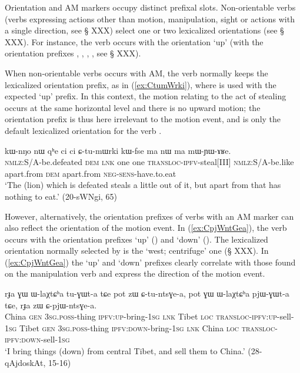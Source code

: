 Orientation and AM markers occupy distinct prefixal slots. Non-orientable verbs (verbs expressing actions other than motion, manipulation, sight or actions with a single direction, see § XXX) select one or two lexicalized orientations (see § XXX). For instance, the verb  occurs with the orientation `up' (with the orientation prefixes , , , , see § XXX). 

When non-orientable verbs occurs with AM, the verb normally keeps the lexicalized orientation prefix, as in (\ref{ex:CtumWrki}), where  is used with the expected  `up' prefix. In this context, the motion relating to the act of stealing occurs at the same horizontal level and there is no upward motion; the orientation prefix is thus here irrelevant to the motion event, and is only the default lexicalized orientation for the verb .

\begin{exe}
\ex \label{ex:CtumWrki}
 \gll kɯ-nŋo nɯ qʰe ci ci ɕ-tu-mɯrki kɯ-fse ma nɯ ma mɯ-ɲɯ-ɤʁe. \\
\textsc{nmlz}:S/A-be.defeated \textsc{dem} \textsc{lnk} one one \textsc{transloc}-\textsc{ipfv}-steal[III] \textsc{nmlz}:S/A-be.like apart.from \textsc{dem} apart.from \textsc{neg}-\textsc{sens}-have.to.eat \\
\glt `The (lion) which is defeated steals a little out of it, but apart from that has nothing to eat.' (20-sWNgi, 65)
\end{exe}

However, alternatively, the orientation prefixes of verbs with an AM marker can also reflect the orientation of the motion event. In (\ref{ex:CpjWntGea}), the verb  occurs with the orientation prefixes `up' () and `down'  (). The lexicalized orientation normally selected by   is the `west; centrifuge' one (§ XXX). In (\ref{ex:CpjWntGea}) the `up' and `down' prefixes clearly correlate with those found on the manipulation verb  and express the direction of the motion event.

\begin{exe}
\ex \label{ex:CpjWntGea}
\gll rɟa ɣɯ ɯ-laχtɕʰa tu-ɣɯt-a tɕe pot zɯ ɕ-tu-ntsɣe-a, pot ɣɯ ɯ-laχtɕʰa pjɯ-ɣɯt-a tɕe, rɟa zɯ ɕ-pjɯ-ntsɣe-a. \\
China \textsc{gen} \textsc{3sg}.\textsc{poss}-thing  \textsc{ipfv}:\textsc{up}-bring-\textsc{1sg} \textsc{lnk} Tibet \textsc{loc} \textsc{transloc}-\textsc{ipfv}:\textsc{up}-sell-\textsc{1sg}  Tibet \textsc{gen} \textsc{3sg}.\textsc{poss}-thing  \textsc{ipfv}:\textsc{down}-bring-\textsc{1sg} \textsc{lnk} China \textsc{loc} \textsc{transloc}-\textsc{ipfv}:\textsc{down}-sell-\textsc{1sg} \\
\glt `I bring things (down) from central Tibet, and sell them to China.' (28-qAjdoskAt, 15-16)
\end{exe}
 
